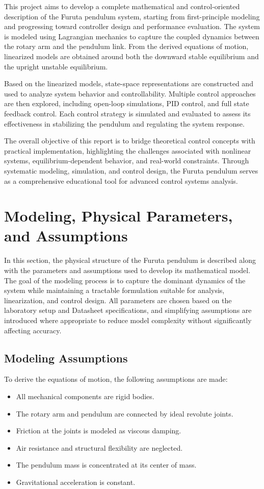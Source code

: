 \documentclass[12pt,a4paper]{article}
\begin{document}
This project aims to develop a complete mathematical and control-oriented description of the Furuta pendulum system, starting from first-principle modeling and progressing toward controller design and performance evaluation. The system is modeled using Lagrangian mechanics to capture the coupled dynamics between the rotary arm and the pendulum link. From the derived equations of motion, linearized models are obtained around both the downward stable equilibrium and the upright unstable equilibrium.

Based on the linearized models, state-space representations are constructed and used to analyze system behavior and controllability. Multiple control approaches are then explored, including open-loop simulations, PID control, and full state feedback control. Each control strategy is simulated and evaluated to assess its effectiveness in stabilizing the pendulum and regulating the system response.

The overall objective of this report is to bridge theoretical control concepts with practical implementation, highlighting the challenges associated with nonlinear systems, equilibrium-dependent behavior, and real-world constraints. Through systematic modeling, simulation, and control design, the Furuta pendulum serves as a comprehensive educational tool for advanced control systems analysis.

\section{Modeling, Physical Parameters, and Assumptions}
In this section, the physical structure of the Furuta pendulum is described along with the parameters and assumptions used to develop its mathematical model. The goal of the modeling process is to capture the dominant dynamics of the system while maintaining a tractable formulation suitable for analysis, linearization, and control design. All parameters are chosen based on the laboratory setup and Datasheet specifications, and simplifying assumptions are introduced where appropriate to reduce model complexity without significantly affecting accuracy.

\subsection*{Modeling Assumptions}

To derive the equations of motion, the following assumptions are made:

\begin{itemize}
    \item All mechanical components are rigid bodies.
    \item The rotary arm and pendulum are connected by ideal revolute joints.
    \item Friction at the joints is modeled as viscous damping.
    \item Air resistance and structural flexibility are neglected.
    \item The pendulum mass is concentrated at its center of mass.
    \item Gravitational acceleration is constant.
\end{itemize}
\end{document}
